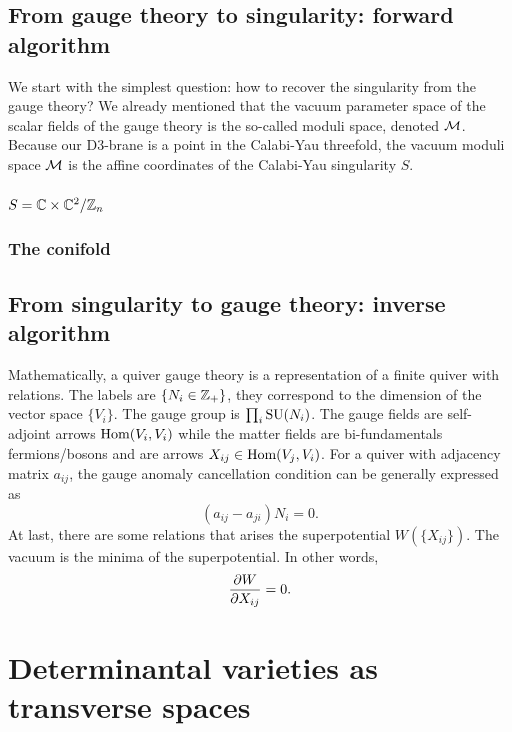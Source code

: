     \subsection{From gauge theory to singularity: forward algorithm}

        We start with the simplest question: how to recover the singularity from the gauge theory? We already mentioned that the vacuum parameter space of the scalar fields of the gauge theory is the so-called moduli space, denoted $\mathcal{M}$. Because our D$3$-brane is a point in the Calabi-Yau threefold, the vacuum moduli space $\mathcal{M}$ is the affine coordinates of the Calabi-Yau singularity $S$.



        \subsubsection{$S=\mathbb{C}\times\mathbb{C}^2/\mathbb{Z}_n$}

        \subsubsection{The conifold}

    \subsection{From singularity to gauge theory: inverse algorithm}

        Mathematically, a quiver gauge theory is a representation of a finite quiver with relations. The labels are $\{N_i\in\mathbb{Z}_+\}$, they correspond to the dimension of the vector space $\{V_i\}$. The gauge group is $\prod_i\text{SU}(N_i)$. The gauge fields are self-adjoint arrows $\text{Hom}(V_i,V_i)$ while the matter fields are bi-fundamentals fermions/bosons and are arrows $X_{ij}\in\text{Hom}(V_j,V_i)$. For a quiver with adjacency matrix $a_{ij}$, the gauge anomaly cancellation condition can be generally expressed as
        \begin{equation}
            (a_{ij}-a_{ji})N_i=0.
        \end{equation}
        At last, there are some relations that arises the superpotential $W(\{X_{ij}\})$. The vacuum is the minima of the superpotential. In other words,
        \begin{equation}
            \pdv{W}{X_{ij}}=0.
        \end{equation}

\section{Determinantal varieties as transverse spaces}

